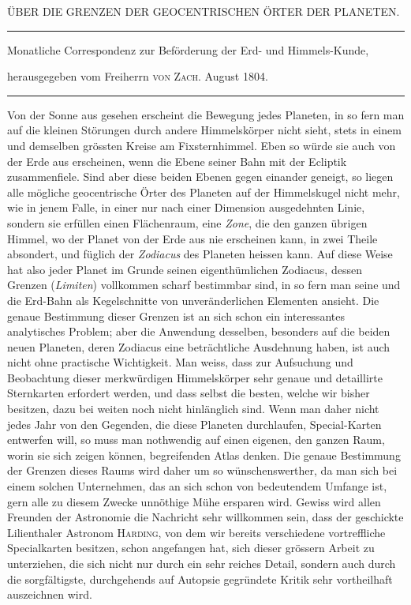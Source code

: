 \clearpage{}%
\begin{center}
{\small ÜBER DIE GRENZEN DER GEOCENTRISCHEN ÖRTER DER PLANETEN.\par}
\medskip\hrule\medskip
{\small Monatliche Correspondenz zur Beförderung der Erd- und Himmels-Kunde,\par
herausgegeben vom Freiherrn \textsc{von Zach}. August 1804.\par}
\medskip\hrule
\end{center}\medskip
Von der Sonne aus gesehen erscheint die Bewegung jedes Planeten, in so
fern man auf die kleinen Störungen durch andere Himmelskörper nicht sieht,
stets in einem und demselben grössten Kreise am Fixsternhimmel. Eben so
würde sie auch von der Erde aus erscheinen, wenn die Ebene seiner Bahn mit
der Ecliptik zusammenfiele. Sind aber diese beiden Ebenen gegen einander geneigt,
so liegen alle mögliche geocentrische Örter des Planeten auf der Himmelskugel
nicht mehr, wie in jenem Falle, in einer nur nach einer Dimension ausgedehnten
Linie, sondern sie erfüllen einen Flächenraum, eine \textit{Zone}, die den
ganzen übrigen Himmel, wo der Planet von der Erde aus nie erscheinen kann,
in zwei Theile absondert, und füglich der \textit{Zodiacus} des Planeten heissen kann.
Auf diese Weise hat also jeder Planet im Grunde seinen eigenthümlichen Zodiacus,
dessen Grenzen (\textit{Limiten}) vollkommen scharf bestimmbar sind, in so fern
man seine und die Erd-Bahn als Kegelschnitte von unveränderlichen Elementen
ansieht. Die genaue Bestimmung dieser Grenzen ist an sich schon ein interessantes
analytisches Problem; aber die Anwendung desselben, besonders auf die
beiden neuen Planeten, deren Zodiacus eine beträchtliche Ausdehnung haben,
ist auch nicht ohne practische Wichtigkeit. Man weiss, dass zur Aufsuchung
und Beobachtung dieser merkwürdigen Himmelskörper sehr genaue und detaillirte
Sternkarten erfordert werden, und dass selbst die besten, welche wir bisher
%
besitzen, dazu bei weiten noch nicht hinlänglich sind. Wenn man daher nicht
jedes Jahr von den Gegenden, die diese Planeten durchlaufen, Special-Karten
entwerfen will, so muss man nothwendig auf einen eigenen, den ganzen Raum,
worin sie sich zeigen können, begreifenden Atlas denken. Die genaue Bestimmung
der Grenzen dieses Raums wird daher um so wünschenswerther, da man
sich bei einem solchen Unternehmen, das an sich schon von bedeutendem Umfange
ist, gern alle zu diesem Zwecke unnöthige Mühe ersparen wird. Gewiss
wird allen Freunden der Astronomie die Nachricht sehr willkommen sein, dass
der geschickte Lilienthaler Astronom \textsc{Harding}, von dem wir bereits verschiedene
vortreffliche Specialkarten besitzen, schon angefangen hat, sich dieser
grössern Arbeit zu unterziehen, die sich nicht nur durch ein sehr reiches Detail,
sondern auch durch die sorgfältigste, durchgehends auf Autopsie gegründete Kritik
sehr vortheilhaft auszeichnen wird.

